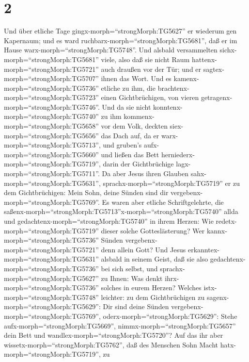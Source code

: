 \hypertarget{section-1}{%
\section{2}\label{section-1}}

 Und über etliche Tage gingx-morph=``strongMorph:TG5627'' er
wiederum gen Kapernaum; und es ward
ruchbarx-morph=``strongMorph:TG5681'', daß er im Hause
warx-morph=``strongMorph:TG5748''.  Und alsbald versammelten
sichx-morph=``strongMorph:TG5681'' viele, also daß sie nicht Raum
hattenx-morph=``strongMorph:TG5721'' auch draußen vor der Tür; und er
sagtex-morph=``strongMorph:TG5707'' ihnen das Wort.  Und es
kamenx-morph=``strongMorph:TG5736'' etliche zu ihm, die
brachtenx-morph=``strongMorph:TG5723'' einen Gichtbrüchigen, von vieren
getragenx-morph=``strongMorph:TG5746''.  Und da sie nicht
konntenx-morph=``strongMorph:TG5740'' zu ihm
kommenx-morph=``strongMorph:TG5658'' vor dem Volk, deckten
siex-morph=``strongMorph:TG5656'' das Dach auf, da er
warx-morph=``strongMorph:TG5713'', und gruben's
aufx-morph=``strongMorph:TG5660'' und ließen das Bett
herniederx-morph=``strongMorph:TG5719'', darin der Gichtbrüchige
lagx-morph=``strongMorph:TG5711''.  Da aber Jesus ihren
Glauben sahx-morph=``strongMorph:TG5631'',
sprachx-morph=``strongMorph:TG5719'' er zu dem Gichtbrüchigen: Mein
Sohn, deine Sünden sind dir vergebenx-morph=``strongMorph:TG5769''.
 Es waren aber etliche Schriftgelehrte, die
saßenx-morph=``strongMorph:TG5713''x-morph=``strongMorph:TG5740'' allda
und gedachtenx-morph=``strongMorph:TG5740'' in ihrem Herzen:
 Wie redetx-morph=``strongMorph:TG5719'' dieser solche
Gotteslästerung? Wer kannx-morph=``strongMorph:TG5736'' Sünden
vergebenx-morph=``strongMorph:TG5721'' denn allein Gott? 
Und Jesus erkanntex-morph=``strongMorph:TG5631'' alsbald in seinem
Geist, daß sie also gedachtenx-morph=``strongMorph:TG5736'' bei sich
selbst, und sprachx-morph=``strongMorph:TG5627'' zu Ihnen: Was denkt
ihrx-morph=``strongMorph:TG5736'' solches in eurem Herzen? 
Welches istx-morph=``strongMorph:TG5748'' leichter: zu dem
Gichtbrüchigen zu sagenx-morph=``strongMorph:TG5629'': Dir sind deine
Sünden vergebenx-morph=``strongMorph:TG5769'',
oderx-morph=``strongMorph:TG5629'': Stehe
aufx-morph=``strongMorph:TG5669'', nimmx-morph=``strongMorph:TG5657''
dein Bett und wandlex-morph=``strongMorph:TG5720''?  Auf
das ihr aber wissetx-morph=``strongMorph:TG5762'', daß des Menschen Sohn
Macht hatx-morph=``strongMorph:TG5719'', zu
